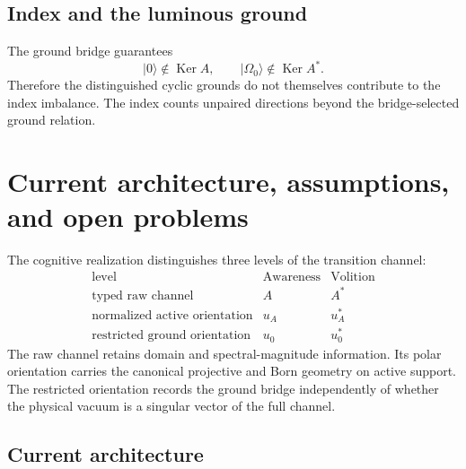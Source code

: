 \documentclass[11pt,reqno]{scrartcl}
\newcommand{\ket}[1]{\lvert #1\rangle}
\DeclareMathOperator{\Ker}{Ker}
\theoremstyle{plain}
\theoremstyle{definition}
\theoremstyle{remark}
\begin{document}
\subsection{Index and the luminous ground}

The ground bridge guarantees
\begin{equation}
  \ket0\notin\Ker A,
  \qquad
  \ket{\Omega_0}\notin\Ker A^*.
  \label{eq:grounds-not-index-zero-modes}
\end{equation}
Therefore the distinguished cyclic grounds do not themselves contribute to
the index imbalance.  The index counts unpaired directions beyond the
bridge-selected ground relation.
\section{Current architecture, assumptions, and open problems}
\label{sec:current-architecture}

The cognitive realization distinguishes three levels of the transition
channel:
\begin{equation}
  \boxed{
  \begin{array}{c|c|c}
  \text{level} & \text{Awareness} & \text{Volition}\\
  \hline
  \text{typed raw channel} & A & A^*\\
  \text{normalized active orientation} & u_A & u_A^*\\
  \text{restricted ground orientation} & u_0 & u_0^*
  \end{array}}
  \label{eq:three-level-AV-table}
\end{equation}
The raw channel retains domain and spectral-magnitude information.  Its polar
orientation carries the canonical projective and Born geometry on active
support.  The restricted orientation records the ground bridge independently
of whether the physical vacuum is a singular vector of the full channel.

\subsection{Current architecture}
\end{document}
